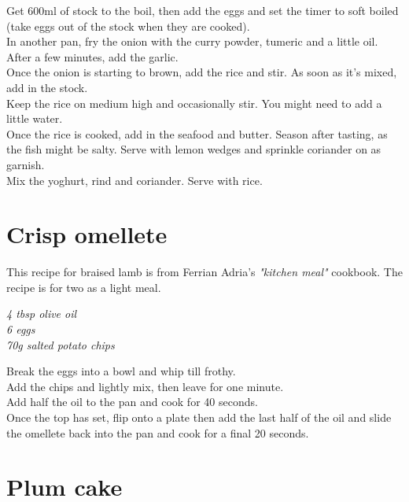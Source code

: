 \documentclass{tufte-book}
\begin{document}
\smallskip
Get 600ml of stock to the boil, then add the eggs and set the timer to soft boiled (take eggs out of the stock when they are cooked).
\\In another pan, fry the onion with the curry powder, tumeric and a little oil. After a few minutes, add the garlic.
\\Once the onion is starting to brown, add the rice and stir. As soon as it's mixed, add in the stock. 
\\Keep the rice on medium high and occasionally stir. You might need to add a little water.
\\Once the rice is cooked, add in the seafood and butter. Season after tasting, as the fish might be salty. Serve with lemon wedges and sprinkle coriander on as garnish.
\\Mix the yoghurt, rind and coriander. Serve with rice.


\section{Crisp omellete}

This recipe for braised lamb is from Ferrian Adria's \emph{"kitchen meal"} cookbook. The recipe is for two as a light meal. 

\smallskip
\emph{4 tbsp olive oil
\\6 eggs
\\70g salted potato chips
}

\smallskip
Break the eggs into a bowl and whip till frothy.
\\Add the chips and lightly mix, then leave for one minute.
\\Add half the oil to the pan and cook for 40 seconds.
\\Once the top has set, flip onto a plate then add the last half of the oil and slide the omellete back into the pan and cook for a final 20 seconds.

\newpage

\section{Plum cake}
\end{document}
